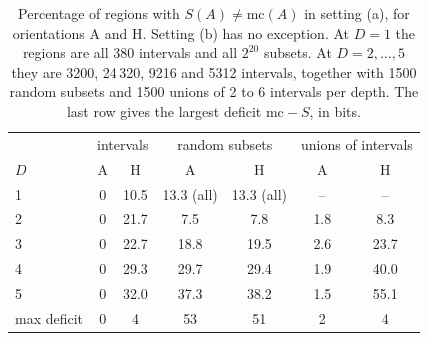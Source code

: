 \begin{table}[ht]\centering\small
\caption{Percentage of regions with $S(A)\neq\mathrm{mc}(A)$ in setting (a), for orientations A and H. Setting (b) has no exception.
At $D=1$ the regions are all 380 intervals and all $2^{20}$ subsets. At $D=2,\dots,5$ they are 3200, 24\,320, 9216 and 5312 intervals,
together with 1500 random subsets and 1500 unions of 2 to 6 intervals per depth. The last row gives the largest deficit
$\mathrm{mc}-S$, in bits. }\label{tab:holocode-rt}
\begin{tabular}{lcccccc}\toprule
& \multicolumn{2}{c}{intervals} & \multicolumn{2}{c}{random subsets} & \multicolumn{2}{c}{unions of intervals} \\
$D$ & A & H & A & H & A & H \\\midrule
1 & 0 & 10.5 & 13.3 (all) & 13.3 (all) & -- & -- \\
2 & 0 & 21.7 & 7.5 & 7.8 & 1.8 & 8.3 \\
3 & 0 & 22.7 & 18.8 & 19.5 & 2.6 & 23.7 \\
4 & 0 & 29.3 & 29.7 & 29.4 & 1.9 & 40.0 \\
5 & 0 & 32.0 & 37.3 & 38.2 & 1.5 & 55.1 \\\midrule
max deficit & 0 & 4 & 53 & 51 & 2 & 4 \\\bottomrule
\end{tabular}
\end{table}

